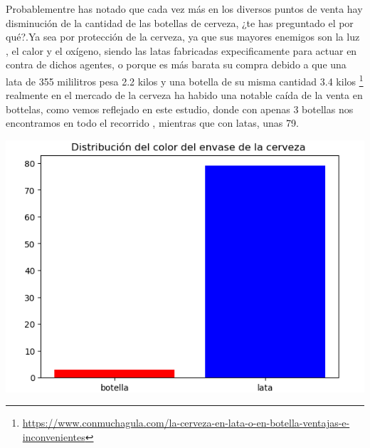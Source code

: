 \documentclass[a4paper,11pt]{article}
\begin{document}
\par\vspace{2pt}
Probablementre has notado que cada vez más en los diversos puntos de venta hay disminución de la cantidad  de las botellas de cerveza, ¿te has preguntado el por qué?.Ya sea por protección de la cerveza, ya que sus mayores enemigos son la luz , el calor y el oxígeno, siendo las latas fabricadas expecificamente para actuar en contra de dichos agentes, o porque es más barata su compra debido a que una lata de 355 mililitros pesa 2.2 kilos y una botella de su misma cantidad 3.4 kilos
\footnote{\href{https://www.conmuchagula.com/la-cerveza-en-lata-o-en-botella-ventajas-e-inconvenientes}{https://www.conmuchagula.com/la-cerveza-en-lata-o-en-botella-ventajas-e-inconvenientes}}
realmente en el mercado de la cerveza ha habido una notable caída de la venta en bottelas, como vemos reflejado en este estudio, donde con apenas 3 botellas nos encontramos en todo el recorrido , mientras que con latas, unas 79.
\par\vspace{2pt}
\begin{minipage}{0.5\textwidth}
  \begin{center}
    \includegraphics[width=1.7\textwidth]{envase cerveza.png}
  \end{center}
\end{minipage}
\par\vspace{2pt}
\end{document}
